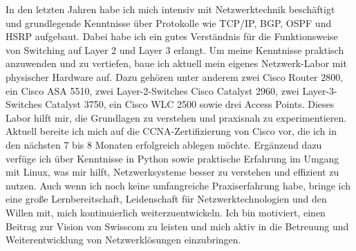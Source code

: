 \documentclass[11pt, a4paper]{awesome-cv}
\begin{document}
\begin{cvletter}
In den letzten Jahren habe ich mich intensiv mit Netzwerktechnik beschäftigt und grundlegende Kenntnisse über Protokolle wie TCP/IP, BGP, OSPF und HSRP aufgebaut. Dabei habe ich ein gutes Verständnis für die Funktionsweise von Switching auf Layer 2 und Layer 3 erlangt.
Um meine Kenntnisse praktisch anzuwenden und zu vertiefen, baue ich aktuell mein eigenes Netzwerk-Labor mit physischer Hardware auf. Dazu gehören unter anderem zwei Cisco Router 2800, ein Cisco ASA 5510, zwei Layer-2-Switches Cisco Catalyst 2960, zwei Layer-3-Switches Catalyst 3750, ein Cisco WLC 2500 sowie drei Access Points. Dieses Labor hilft mir, die Grundlagen zu verstehen und praxisnah zu experimentieren.
Aktuell bereite ich mich auf die CCNA-Zertifizierung von Cisco vor, die ich in den nächsten 7 bis 8 Monaten erfolgreich ablegen möchte. Ergänzend dazu verfüge ich über Kenntnisse in Python sowie praktische Erfahrung im Umgang mit Linux, was mir hilft, Netzwerksysteme besser zu verstehen und effizient zu nutzen.
Auch wenn ich noch keine umfangreiche Praxiserfahrung habe, bringe ich eine große Lernbereitschaft, Leidenschaft für Netzwerktechnologien und den Willen mit, mich kontinuierlich weiterzuentwickeln. Ich bin motiviert, einen Beitrag zur Vision von Swisscom zu leisten und mich aktiv in die Betreuung und Weiterentwicklung von Netzwerklösungen einzubringen.





\end{cvletter}


\makeletterclosing
\end{document}
